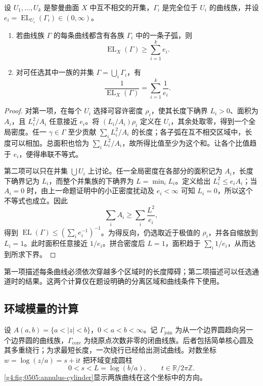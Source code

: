 \begin{proposition}
	\label{g4:prop:0505:series-parallel}
	设 \(U_1,\ldots,U_k\) 是黎曼曲面 \(X\) 中互不相交的开集，\(\Gamma_i\) 是完全位于 \(U_i\) 的曲线族，并设 \(e_i=\operatorname{EL}_{U_i}(\Gamma_i)\in(0,\infty)\)。
	\begin{enumerate}
		\item 若曲线族 \(\Gamma\) 的每条曲线都含有各族 \(\Gamma_i\) 中的一条子弧，则
		\[
			\operatorname{EL}_X(\Gamma)\ge\sum_{i=1}^k e_i.
		\]
		\item 对可任选其中一族的并集 \(\Gamma=\bigcup_i\Gamma_i\)，有
		\[
			\frac1{\operatorname{EL}_X(\Gamma)}=\sum_{i=1}^k\frac1{e_i}.
		\]
	\end{enumerate}
\end{proposition}
\begin{proof}
	对第一项，在每个 \(U_i\) 选择可容许密度 \(\rho_i\)，使其长度下确界 \(L_i>0\)、面积为 \(A_i\)，且 \(L_i^2/A_i\) 任意接近 \(e_i\)。将 \((L_i/A_i)\rho_i\) 定义在 \(U_i\)，其余处取零，得到一个全局密度。任一 \(\gamma\in\Gamma\) 至少贡献 \(\sum_i L_i^2/A_i\) 的长度；各子弧在互不相交区域中，长度可以相加。总面积也恰为 \(\sum_i L_i^2/A_i\)，故所得比值至少为这个和。让各个比值趋于 \(e_i\)，便得串联不等式。

	第二项可以只在并集 \(\bigcup U_i\) 上讨论。任一全局密度在各部分的面积记为 \(A_i\)，长度下确界记为 \(L_i\)，而整个并集族的下确界为 \(L=\min_iL_i\)。定义给出 \(L_i^2\le e_iA_i\)；当 \(A_i=0\) 时，由上一命题证明中的小正密度扰动及 \(e_i<\infty\) 可知 \(L_i=0\)，所以这个不等式也成立。因此
	\[
		\sum_iA_i\ge\sum_i\frac{L^2}{e_i},
	\]
	得到 \(\operatorname{EL}(\Gamma)\le(\sum_i e_i^{-1})^{-1}\)。为得反向，仍选取近于极值的 \(\rho_i\)，并各自缩放到 \(L_i=1\)。此时面积任意接近 \(1/e_i\)。拼合密度后 \(L=1\)，面积趋于 \(\sum_i1/e_i\)，从而达到所求下界。
\end{proof}

第一项描述每条曲线必须依次穿越多个区域时的长度障碍；第二项描述可以任选通道时的结果。这两个计算仅在题设明确的分离区域和曲线条件下使用。

\subsection{环域模量的计算}
\label{g4:subsec:0505:03}

设 \(A(a,b)=\{a<|z|<b\}\)，\(0<a<b<\infty\)。记 \(\Gamma_{\mathrm{join}}\) 为从一个边界圆趋向另一个边界圆的曲线族，\(\Gamma_{\mathrm{core}}\) 为绕原点次数非零的闭曲线族。后者包括简单核心圆及其多重绕行；为求最短长度，一次绕行已经给出测试曲线。对数坐标 \(w=\log(z/a)=s+\mathrm{i}t\) 把环域变成圆柱
\[
	0<s<L=\log(b/a),\qquad t\in\mathbb R/2\pi\mathbb Z.
\]
\cref{g4:fig:0505:annulus-cylinder}显示两族曲线在这个坐标中的方向。

